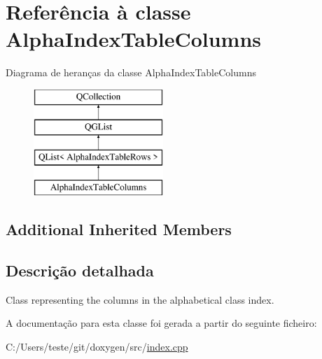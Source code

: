 \hypertarget{class_alpha_index_table_columns}{\section{Referência à classe Alpha\-Index\-Table\-Columns}
\label{class_alpha_index_table_columns}
}
Diagrama de heranças da classe Alpha\-Index\-Table\-Columns\begin{figure}[H]
\begin{center}
\leavevmode
\includegraphics[height=4.000000cm]{class_alpha_index_table_columns}
\end{center}
\end{figure}
\subsection*{Additional Inherited Members}


\subsection{Descrição detalhada}
Class representing the columns in the alphabetical class index. 

A documentação para esta classe foi gerada a partir do seguinte ficheiro\-:\begin{DoxyCompactItemize}
\item 
C\-:/\-Users/teste/git/doxygen/src/\hyperlink{index_8cpp}{index.\-cpp}\end{DoxyCompactItemize}

